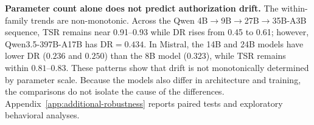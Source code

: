 \textbf{Parameter count alone does not predict authorization drift.}
The within-family trends are non-monotonic. Across the Qwen 4B$\to$9B$\to$27B$\to$35B-A3B sequence, TSR remains near 0.91--0.93 while DR rises from 0.45 to 0.61; however, Qwen3.5-397B-A17B has $\mathrm{DR}=0.434$. In Mistral, the 14B and 24B models have lower DR ($0.236$ and $0.250$) than the 8B model ($0.323$), while TSR remains within $0.81$--$0.83$. These patterns show that drift is not monotonically determined by parameter scale. Because the models also differ in architecture and training, the comparisons do not isolate the cause of the differences. Appendix~\ref{app:additional-robustness} reports paired tests and exploratory behavioral analyses.
